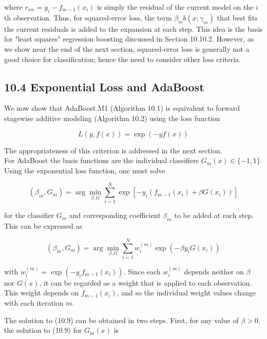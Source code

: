 \documentclass[10pt]{article}
\begin{document}
where $r_{i m}=y_{i}-f_{m-1}\left(x_{i}\right)$ is simply the residual of the current model on the $i$ th observation. Thus, for squared-error loss, the term $\beta_{m} b\left(x ; \gamma_{m}\right)$ that best fits the current residuals is added to the expansion at each step. This idea is the basis for "least squares" regression boosting discussed in Section 10.10.2. However, as we show near the end of the next section, squared-error loss is generally not a good choice for classification; hence the need to consider other loss criteria.

\subsection*{10.4 Exponential Loss and AdaBoost}
We now show that AdaBoost.M1 (Algorithm 10.1) is equivalent to forward stagewise additive modeling (Algorithm 10.2) using the loss function


\begin{equation*}
L(y, f(x))=\exp (-y f(x)) \tag{10.8}
\end{equation*}


The appropriateness of this criterion is addressed in the next section.\\
For AdaBoost the basis functions are the individual classifiers $G_{m}(x) \in \{-1,1\}$. Using the exponential loss function, one must solve

$$
\left(\beta_{m}, G_{m}\right)=\arg \min _{\beta, G} \sum_{i=1}^{N} \exp \left[-y_{i}\left(f_{m-1}\left(x_{i}\right)+\beta G\left(x_{i}\right)\right)\right]
$$

for the classifier $G_{m}$ and corresponding coefficient $\beta_{m}$ to be added at each step. This can be expressed as


\begin{equation*}
\left(\beta_{m}, G_{m}\right)=\arg \min _{\beta, G} \sum_{i=1}^{N} w_{i}^{(m)} \exp \left(-\beta y_{i} G\left(x_{i}\right)\right) \tag{10.9}
\end{equation*}


with $w_{i}^{(m)}=\exp \left(-y_{i} f_{m-1}\left(x_{i}\right)\right)$. Since each $w_{i}^{(m)}$ depends neither on $\beta$ nor $G(x)$, it can be regarded as a weight that is applied to each observation. This weight depends on $f_{m-1}\left(x_{i}\right)$, and so the individual weight values change with each iteration $m$.

The solution to (10.9) can be obtained in two steps. First, for any value of $\beta>0$, the solution to (10.9) for $G_{m}(x)$ is
\end{document}
